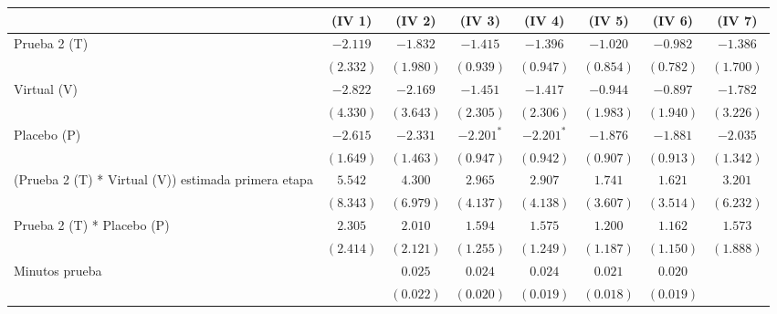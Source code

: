 
\begin{table}
\begin{center}
\begin{tabular}{l c c c c c c c}
\hline
 & (IV 1) & (IV 2) & (IV 3) & (IV 4) & (IV 5) & (IV 6) & (IV 7) \\
\hline
Prueba 2 (T)                                        & $-2.119$  & $-1.832$  & $-1.415$     & $-1.396$     & $-1.020$     & $-0.982$     & $-1.386$    \\
                                                    & $(2.332)$ & $(1.980)$ & $(0.939)$    & $(0.947)$    & $(0.854)$    & $(0.782)$    & $(1.700)$   \\
Virtual (V)                                         & $-2.822$  & $-2.169$  & $-1.451$     & $-1.417$     & $-0.944$     & $-0.897$     & $-1.782$    \\
                                                    & $(4.330)$ & $(3.643)$ & $(2.305)$    & $(2.306)$    & $(1.983)$    & $(1.940)$    & $(3.226)$   \\
Placebo (P)                                         & $-2.615$  & $-2.331$  & $-2.201^{*}$ & $-2.201^{*}$ & $-1.876$     & $-1.881$     & $-2.035$    \\
                                                    & $(1.649)$ & $(1.463)$ & $(0.947)$    & $(0.942)$    & $(0.907)$    & $(0.913)$    & $(1.342)$   \\
(Prueba 2 (T) * Virtual (V)) estimada primera etapa & $5.542$   & $4.300$   & $2.965$      & $2.907$      & $1.741$      & $1.621$      & $3.201$     \\
                                                    & $(8.343)$ & $(6.979)$ & $(4.137)$    & $(4.138)$    & $(3.607)$    & $(3.514)$    & $(6.232)$   \\
Prueba 2 (T) * Placebo (P)                          & $2.305$   & $2.010$   & $1.594$      & $1.575$      & $1.200$      & $1.162$      & $1.573$     \\
                                                    & $(2.414)$ & $(2.121)$ & $(1.255)$    & $(1.249)$    & $(1.187)$    & $(1.150)$    & $(1.888)$   \\
Minutos prueba                                      &           & $0.025$   & $0.024$      & $0.024$      & $0.021$      & $0.020$      &             \\
                                                    &           & $(0.022)$ & $(0.020)$    & $(0.019)$    & $(0.018)$    & $(0.019)$    &             \\

\end{tabular}
\end{center}
\end{table}
